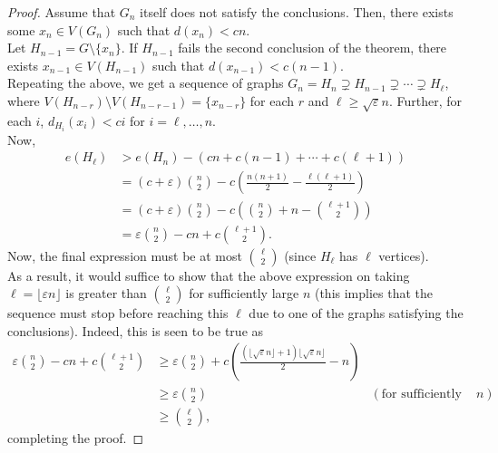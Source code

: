 \documentclass{article}
\begin{document}
			\begin{proof}
				Assume that $G_n$ itself does not satisfy the conclusions. Then, there exists some $x_n \in V(G_n)$ such that $d(x_n) < cn$.\\
				Let $H_{n-1} = G \setminus \{x_n\}$. If $H_{n-1}$ fails the second conclusion of the theorem, there exists $x_{n-1} \in V(H_{n-1})$ such that $d(x_{n-1}) < c (n-1)$.\\
				Repeating the above, we get a sequence of graphs $G_n = H_n \supsetneq H_{n-1} \supsetneq \cdots \supsetneq H_{\ell}$, where $V(H_{n-r}) \setminus V(H_{n-r-1}) = \{x_{n-r}\}$ for each $r$ and $\ell \ge \sqrt{\varepsilon} n$. Further, for each $i$, $d_{H_i}(x_i) < c i$ for $i = \ell,\ldots,n$.\\
				Now,
				\begin{align*}
					e(H_\ell) &> e(H_n) - \left(cn + c(n-1) + \cdots + c(\ell+1)\right) \\
					&= (c+\varepsilon)\binom{n}{2} - c \left(\frac{n(n+1)}{2} - \frac{\ell(\ell+1)}{2}\right) \\
					&= (c+\varepsilon)\binom{n}{2} - c \left(\binom{n}{2} + n - \binom{\ell+1}{2}\right) \\
					&= \varepsilon\binom{n}{2} - cn + c \binom{\ell+1}{2}.
				\end{align*}
				Now, the final expression must be at most $\binom{\ell}{2}$ (since $H_\ell$ has $\ell$ vertices).\\
				As a result, it would suffice to show that the above expression on taking $\ell = \lfloor \varepsilon n \rfloor$ is greater than $\binom{\ell}{2}$ for sufficiently large $n$ (this implies that the sequence must stop before reaching this $\ell$ due to one of the graphs satisfying the conclusions). Indeed, this is seen to be true as
				\begin{align*}
					\varepsilon\binom{n}{2} - cn + c\binom{\ell+1}{2} &\ge \varepsilon\binom{n}{2} + c\left(\frac{(\lfloor\sqrt{\varepsilon}n\rfloor+1)\lfloor\sqrt{\varepsilon}n\rfloor}{2} - n\right) \\
					&\ge \varepsilon\binom{n}{2} & (\text{for sufficiently large $n$}) \\
					&\ge \binom{\ell}{2},
				\end{align*}
				completing the proof.
			\end{proof}


\end{document}
